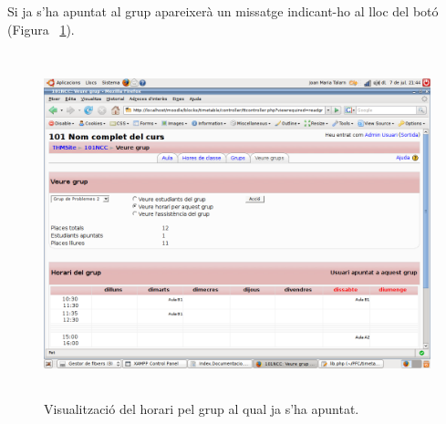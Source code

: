\documentclass[a4paper]{report}  %
\begin{document}
\begin{itemize}
Si ja s'ha apuntat al grup apareixerà un missatge indicant-ho al lloc del botó (Figura ~\ref{fig:VeureGrupJaMeapuntat}).
		\begin{figure}[H] %
		\begin{center}
		\includegraphics[height=10cm,width=12cm]{img/VeureGrupJaMeapuntat.png}
		\caption[List caption]{Visualització del horari pel grup al qual ja s'ha apuntat.}
		\label{fig:VeureGrupJaMeapuntat}
		\end{center}
		\end{figure}


\end{itemize}
\end{document}
